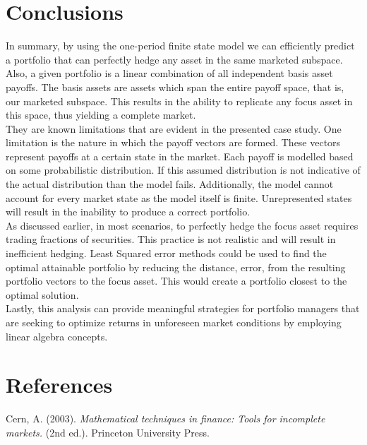\documentclass[a4paper,11pt]{report}
\begin{document}
\begin{multicols}{2}
\section{Conclusions}
In summary, by using the one-period finite state model we can efficiently predict a portfolio that can perfectly hedge any asset in the same marketed subspace. 
Also, a given portfolio is a linear combination of all independent basis asset payoffs. 
The basis assets are assets which span the entire payoff space, that is, our marketed subspace. 
This results in the ability to replicate any focus asset in this space, thus yielding a complete market.
\\
\indent
They are known limitations that are evident in the presented case study. One limitation is the nature in which the payoff vectors are formed. These vectors represent payoffs at a certain state in the market. Each payoff is modelled based on some probabilistic distribution. If this assumed distribution is not indicative of the actual distribution than the model fails. Additionally, the model cannot account for every market state as the model itself is finite. Unrepresented states will result in the inability to produce a correct portfolio. 
\\
\indent
As discussed earlier, in most scenarios, to perfectly hedge the focus asset requires trading fractions of securities. 
This practice is not realistic and will result in inefficient hedging.
Least Squared error methods could be used to find the optimal attainable portfolio by reducing the distance, error, from the resulting portfolio vectors to the focus asset.
This would create a portfolio closest to the optimal solution.
\\
\indent
Lastly, this analysis can provide meaningful strategies for portfolio managers that are seeking to optimize returns in unforeseen market conditions by employing linear algebra concepts.
\section{References}
Cern, A. (2003). \textit{Mathematical techniques in finance: Tools for incomplete markets.} (2nd ed.). Princeton University Press.
\end{multicols}
\end{document}
